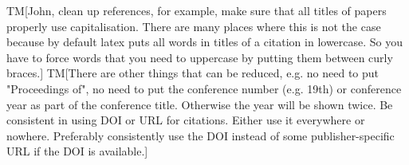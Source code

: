 \documentclass[10pt,conference]{IEEEtran}
\newcommand{\tm}[1]{{\color{blue}\textsf{TM}[\smaller\sffamily #1}]}
\begin{document}








\newpage
\tm{John, clean up references, for example, make sure that all titles of papers properly use capitalisation. There are many places where this is not the case because by default latex puts all words in titles of a citation in lowercase. So you have to force words that you need to uppercase by putting them between curly braces.}
\tm{There are other things that can be reduced, e.g. no need to put "Proceedings of", no need to put the conference number (e.g. 19th) or conference year as part of the conference title. Otherwise the year will be shown twice. Be consistent in using DOI or URL for citations. Either use it everywhere or nowhere. Preferably consistently use the DOI instead of some publisher-specific URL if the DOI is available.}


\typeout{}

\end{document}
